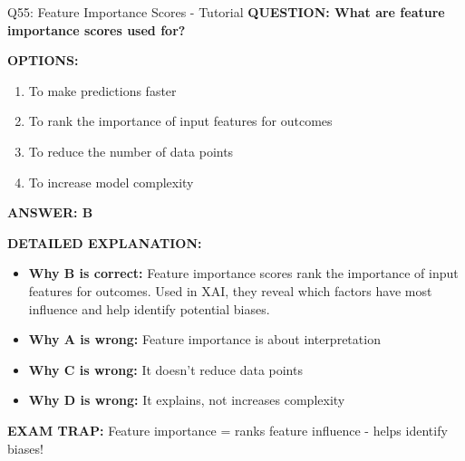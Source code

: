 \documentclass[8pt]{beamer}
\begin{document}
	\begin{frame}{Q55: Feature Importance Scores - Tutorial}
		\fontsize{6.5}{7.5}\selectfont
		\textbf{QUESTION: What are feature importance scores used for?}
		
		\vspace{0.1cm}
		\textbf{OPTIONS:}
		\begin{enumerate}
			\item To make predictions faster
			\item To rank the importance of input features for outcomes
			\item To reduce the number of data points
			\item To increase model complexity
		\end{enumerate}
		
		\vspace{0.1cm}
		\textcolor{myblue}{\textbf{ANSWER: B}}
		
		\vspace{0.1cm}
		\textbf{DETAILED EXPLANATION:}
		\begin{itemize}
			\item \textbf{Why B is correct:} Feature importance scores rank the importance of input features for outcomes. Used in XAI, they reveal which factors have most influence and help identify potential biases.
			\item \textbf{Why A is wrong:} Feature importance is about interpretation
			\item \textbf{Why C is wrong:} It doesn't reduce data points
			\item \textbf{Why D is wrong:} It explains, not increases complexity
		\end{itemize}
		
		\textcolor{myred}{\textbf{EXAM TRAP:}} Feature importance = \textcolor{myblue}{ranks feature influence} - helps identify biases!
	\end{frame}
	
\end{document}
